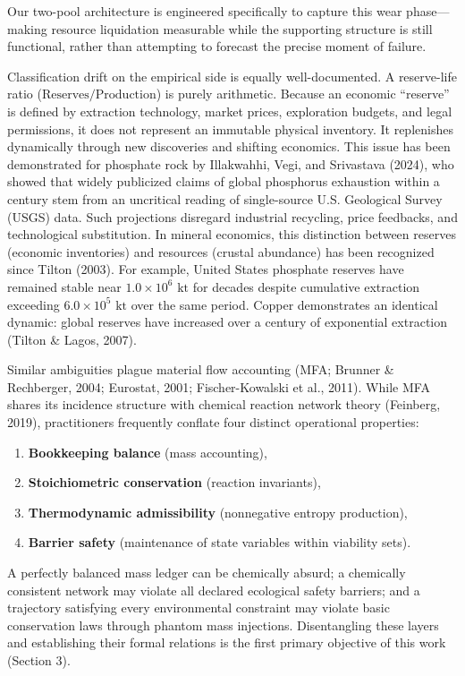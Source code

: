 \documentclass[11pt]{article}
\begin{document}
Our two-pool architecture is engineered specifically to capture this wear phase---making resource liquidation measurable while the supporting structure is still functional, rather than attempting to forecast the precise moment of failure.

Classification drift on the empirical side is equally well-documented. A reserve-life ratio (\(\text{Reserves}/\text{Production}\)) is purely arithmetic. Because an economic ``reserve'' is defined by extraction technology, market prices, exploration budgets, and legal permissions, it does not represent an immutable physical inventory. It replenishes dynamically through new discoveries and shifting economics. This issue has been demonstrated for phosphate rock by Illakwahhi, Vegi, and Srivastava (2024), who showed that widely publicized claims of global phosphorus exhaustion within a century stem from an uncritical reading of single-source U.S. Geological Survey (USGS) data. Such projections disregard industrial recycling, price feedbacks, and technological substitution. In mineral economics, this distinction between reserves (economic inventories) and resources (crustal abundance) has been recognized since Tilton (2003). For example, United States phosphate reserves have remained stable near \(1.0\times 10^6\text{ kt}\) for decades despite cumulative extraction exceeding \(6.0\times 10^5\text{ kt}\) over the same period. Copper demonstrates an identical dynamic: global reserves have increased over a century of exponential extraction (Tilton \& Lagos, 2007).

Similar ambiguities plague material flow accounting (MFA; Brunner \& Rechberger, 2004; Eurostat, 2001; Fischer-Kowalski et al., 2011). While MFA shares its incidence structure with chemical reaction network theory (Feinberg, 2019), practitioners frequently conflate four distinct operational properties:

\begin{enumerate}\setlength{\itemsep}{2pt}
\item \textbf{Bookkeeping balance} (mass accounting),
\item \textbf{Stoichiometric conservation} (reaction invariants),
\item \textbf{Thermodynamic admissibility} (nonnegative entropy production),
\item \textbf{Barrier safety} (maintenance of state variables within viability sets).
\end{enumerate}

A perfectly balanced mass ledger can be chemically absurd; a chemically consistent network may violate all declared ecological safety barriers; and a trajectory satisfying every environmental constraint may violate basic conservation laws through phantom mass injections. Disentangling these layers and establishing their formal relations is the first primary objective of this work (Section 3).
\end{document}
